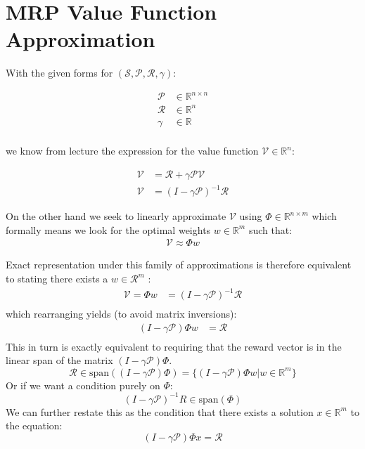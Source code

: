 \documentclass{article}[12pt]
\begin{document}
\section{MRP Value Function Approximation}
With the given forms for $(\mathcal{S},\mathcal{P},\mathcal{R}, \gamma)$: 

\begin{align*}
\mathcal{P} &\in \mathbb{R}^{n\times n}\\
\mathcal{R} &\in \mathbb{R}^{n}\\
\gamma &\in \mathbb{R}\\
\end{align*} 

we know from lecture the expression for the value function $\mathcal{V} \in \mathbb{R}^n$:

\begin{align*}
\mathcal{V} & =\mathcal{R}  + \gamma \mathcal{P}\mathcal{V} \\
\mathcal{V}  &=(I - \gamma \mathcal{P})^{-1} \mathcal{R}
\end{align*} 

On the other hand we seek to linearly approximate $\mathcal{V}$ using $\Phi \in \mathbb{R}^{n\times m}$ which formally means we look for the optimal weights $w\in \mathbb{R}^m$ such that:
\begin{align*}
\mathcal{V} \approx \Phi w
\end{align*}

Exact representation under this family of approximations is therefore equivalent to stating there exists a $w \in \mathcal{R}^m$ :
\begin{align*}
\mathcal{V} =\Phi w &= (I - \gamma \mathcal{P})^{-1} \mathcal{R}\\
\end{align*}
which rearranging yields (to avoid matrix inversions):
\begin{align*}
(I - \gamma \mathcal{P})\Phi w &= \mathcal{R}\\
\end{align*}
This in turn is exactly equivalent to requiring that the reward vector is in the linear span of the matrix $(I - \gamma \mathcal{P})\Phi$.
 $$ \mathcal{R} \in \text{span}((I - \gamma \mathcal{P})\Phi) = \{(I - \gamma \mathcal{P})\Phi w | w\in\mathbb{R}^m\}$$
 Or if we want a condition purely on $\Phi$:
  $$(I - \gamma \mathcal{P})^{-1}R \in \text{span}(\Phi)$$
 We can further restate this as the condition that there exists a solution $x\in \mathbb{R}^m$ to the equation:
 $$ (I - \gamma \mathcal{P})\Phi x = \mathcal{R}$$
 
\end{document}
